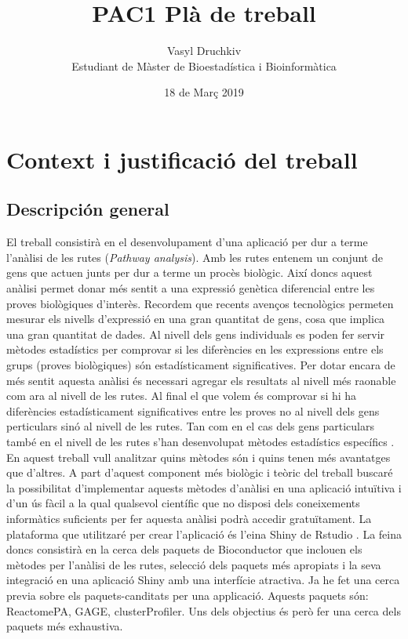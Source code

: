 \documentclass[]{article}
\title{PAC1 Plà de treball}
\date{18 de Març 2019}
\author{Vasyl Druchkiv \\ Estudiant de Màster de Bioestadística i Bioinformàtica}
\begin{document}
\maketitle
\makeatletter
\renewcommand{\@seccntformat}[1]{}
\makeatother
\begin{spacing}{0.1}
\tableofcontents
\end{spacing}

\section{Context i justificació del treball}
\subsection{Descripción general}
El treball consistirà en el desenvolupament d'una aplicació per dur a terme l'anàlisi de les rutes (\textit{Pathway analysis}). Amb les rutes entenem un conjunt de gens que actuen junts per dur a terme un procès biològic. Així doncs aquest anàlisi permet donar més sentit a una expressió genètica diferencial entre les proves biològiques d'interès. Recordem que recents avenços tecnològics permeten mesurar els nivells d'expressió en una gran quantitat de gens, cosa que implica una gran quantitat de dades. Al nivell dels gens individuals es poden fer servir mètodes estadístics per comprovar si les diferències en les expressions entre els grups (proves biològiques) són estadísticament significatives. Per dotar encara de més sentit aquesta anàlisi és necessari agregar els resultats al nivell més raonable com ara al nivell de les rutes. Al final el que volem és comprovar si hi ha diferències estadísticament significatives entre les proves no al nivell dels gens perticulars sinó al nivell de les rutes. Tan com en el cas dels gens particulars també en el nivell de les rutes s'han desenvolupat mètodes estadístics específics \cite{khatri2012ten}. En aquest treball vull analitzar quins mètodes són i quins tenen més avantatges que d'altres. A part d'aquest component més biològic i teòric del treball buscaré la possibilitat d'implementar aquests mètodes d'anàlisi en una aplicació intuïtiva i d'un ús fàcil a la qual qualsevol científic que no disposi dels coneixements informàtics suficients per fer aquesta anàlisi podrà accedir gratuïtament. La plataforma que utilitzaré per crear l'aplicació és l'eina Shiny de Rstudio \cite{Shiny}.  La feina doncs consistirà en la cerca dels paquets de Bioconductor que inclouen els mètodes per l'anàlisi de les rutes, selecció dels paquets més apropiats i la seva integració en una aplicació Shiny amb una interfície atractiva. Ja he fet una cerca previa sobre els paquets-canditats per una applicació. Aquests paquets són: ReactomePA, GAGE, clusterProfiler. Uns dels objectius és però fer una cerca dels paquets més exhaustiva.
\end{document}
